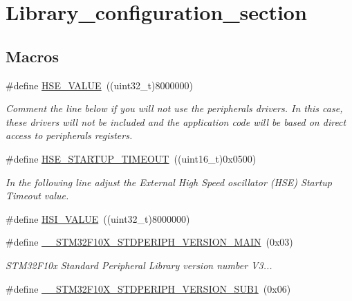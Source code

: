 \hypertarget{group___library__configuration__section}{}\section{Library\+\_\+configuration\+\_\+section}
\label{group___library__configuration__section}
\subsection*{Macros}
\begin{DoxyCompactItemize}
\item 
\#define \mbox{\hyperlink{group___library__configuration__section_gaeafcff4f57440c60e64812dddd13e7cb}{H\+S\+E\+\_\+\+V\+A\+L\+UE}}~((uint32\+\_\+t)8000000)
\begin{DoxyCompactList}\small\item\em Comment the line below if you will not use the peripherals drivers. In this case, these drivers will not be included and the application code will be based on direct access to peripherals registers. \end{DoxyCompactList}\item 
\#define \mbox{\hyperlink{group___library__configuration__section_ga68ecbc9b0a1a40a1ec9d18d5e9747c4f}{H\+S\+E\+\_\+\+S\+T\+A\+R\+T\+U\+P\+\_\+\+T\+I\+M\+E\+O\+UT}}~((uint16\+\_\+t)0x0500)
\begin{DoxyCompactList}\small\item\em In the following line adjust the External High Speed oscillator (H\+SE) Startup Timeout value. \end{DoxyCompactList}\item 
\#define \mbox{\hyperlink{group___library__configuration__section_gaaa8c76e274d0f6dd2cefb5d0b17fbc37}{H\+S\+I\+\_\+\+V\+A\+L\+UE}}~((uint32\+\_\+t)8000000)
\item 
\#define \mbox{\hyperlink{group___library__configuration__section_ga4c236abf68876febcb304f05ed3bafac}{\+\_\+\+\_\+\+S\+T\+M32\+F10\+X\+\_\+\+S\+T\+D\+P\+E\+R\+I\+P\+H\+\_\+\+V\+E\+R\+S\+I\+O\+N\+\_\+\+M\+A\+IN}}~(0x03)
\begin{DoxyCompactList}\small\item\em S\+T\+M32\+F10x Standard Peripheral Library version number V3... \end{DoxyCompactList}\item 
\#define \mbox{\hyperlink{group___library__configuration__section_ga7ce69a7c755b9d0551e9755d28612cb0}{\+\_\+\+\_\+\+S\+T\+M32\+F10\+X\+\_\+\+S\+T\+D\+P\+E\+R\+I\+P\+H\+\_\+\+V\+E\+R\+S\+I\+O\+N\+\_\+\+S\+U\+B1}}~(0x06)

\end{DoxyCompactItemize}
